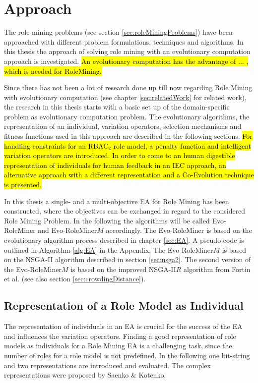 \newpage
\chapter{Approach}
\label{sec:approach}
The role mining problems (see section \ref{sec:roleMiningProblems}) have been approached with different problem formulations, techniques and algorithms. In this thesis the approach of solving role mining with an evolutionary computation approach is investigated. \hl{An evolutionary computation has the advantage of ... , which is needed for RoleMining.}

Since there has not been a lot of research done up till now regarding Role Mining with evolutionary computation (see chapter \ref{sec:relatedWork} for related work), the research in this thesis starts with a basic set up of the domain-specific problem as evolutionary computation problem. The evolutionary algorithms, the representation of an individual, variation operators, selection mechanisms and fitness functions used in this approach are described in the following sections. \hl{For handling constraints for an RBAC$_2$ role model, a penalty function and intelligent variation operators are introduced. In order to come to an human digestible representation of individuals for human feedback in an IEC approach, an alternative approach with a different representation and a Co-Evolution technique is presented.}

In this thesis a single- and a multi-objective EA for Role Mining has been constructed, where the objectives can be exchanged in regard to the considered Role Mining Problem. In the following the algorithms will be called Evo-RoleMiner and Evo-RoleMiner$M$ accordingly.
The Evo-RoleMiner is based on the evolutionary algorithm process described in chapter \ref{sec:EA}. A pseudo-code is outlined in Algorithm \ref{alg:EA} in the Appendix. The Evo-RoleMiner$M$ is based on the NSGA-II algorithm described in section \ref{sec:nsga2}. The second version of the Evo-RoleMiner$M$ is based on the improved NSGA-II$R$ algorithm from Fortin et al.\cite{Fortin:2013} (see also section \ref{sec:crowdingDistance}).
    
    \section{Representation of a Role Model as Individual}
    The representation of individuals in an EA is crucial for the success of the EA and influences the variation operators. Finding a good representation of role models as individuals for a Role Mining EA is a challenging task, since the number of roles for a role model is not predefined. In the following one bit-string and two representations are introduced and evaluated. The complex representations were proposed by Saenko \& Kotenko\cite{saenko2012design}.
    
